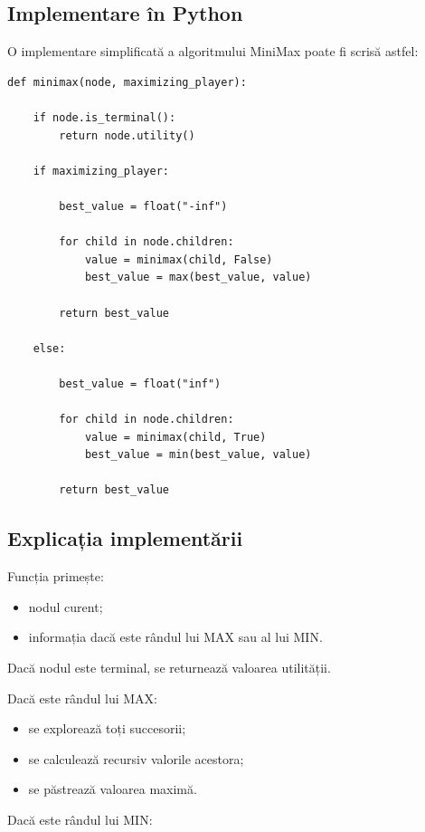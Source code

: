\documentclass[12pt,a4paper]{article}
\begin{document}
\subsection{Implementare în Python}

O implementare simplificată a algoritmului MiniMax poate fi scrisă astfel:

\begin{verbatim}
def minimax(node, maximizing_player):

    if node.is_terminal():
        return node.utility()

    if maximizing_player:

        best_value = float("-inf")

        for child in node.children:
            value = minimax(child, False)
            best_value = max(best_value, value)

        return best_value

    else:

        best_value = float("inf")

        for child in node.children:
            value = minimax(child, True)
            best_value = min(best_value, value)

        return best_value
\end{verbatim}

\subsection{Explicația implementării}

Funcția primește:

\begin{itemize}
\item nodul curent;
\item informația dacă este rândul lui MAX sau al lui MIN.
\end{itemize}

Dacă nodul este terminal, se returnează valoarea utilității.

Dacă este rândul lui MAX:

\begin{itemize}
\item se explorează toți succesorii;
\item se calculează recursiv valorile acestora;
\item se păstrează valoarea maximă.
\end{itemize}

Dacă este rândul lui MIN:
\end{document}
